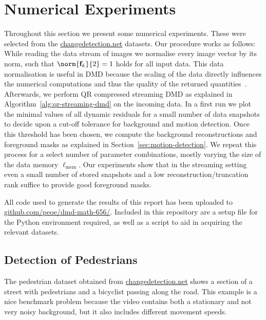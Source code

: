 \section{Numerical Experiments}\label{sec:numerical-experiments}

Throughout this section we present some numerical experiments. These were selected from the \href{changedetection.net}{changedetection.net} datasets. Our procedure works as follows: While reading the data stream of images we normalise every image vector by its norm, such that $\norm{\bl{f}_k}{2} = 1$ holds for all input data. This data normalisation is useful in DMD because the scaling of the data directly influences the numerical computations and thus the quality of the returned quantities~\cite{Drmac2020}. Afterwards, we perform QR compressed streaming DMD as explained in Algorithm~\ref{alg:qr-streaming-dmd} on the incoming data. In a first run we plot the minimal values of all dynamic residuals for a small number of data snapshots to decide upon a cut-off tolerance for background and motion detection. Once this threshold has been chosen, we compute the background reconstructions and foreground masks as explained in Section~\ref{sec:motion-detection}. We repeat this process for a select number of parameter combinations, mostly varying the size of the data memory $\ell_\text{mem}$. Our experiments show that in the streaming setting even a small number of stored snapshots and a low reconstruction/truncation rank suffice to provide good foreground masks.

All code used to generate the results of this report has been uploaded to \href{https://github.com/peoe/dmd-math-656/}{github.com/peoe/dmd-math-656/}. Included in this repository are a setup file for the Python environment required, as well as a script to aid in acquiring the relevant datasets.

\subsection{Detection of Pedestrians}\label{subsec:pedestrians} %

The pedestrian dataset obtained from \href{changedetection.net}{changedetection.net} shows a section of a street with pedestrians and a bicyclist passing along the road. This example is a nice benchmark problem because the video contains both a stationary and not very noisy background, but it also includes different movement speeds.

